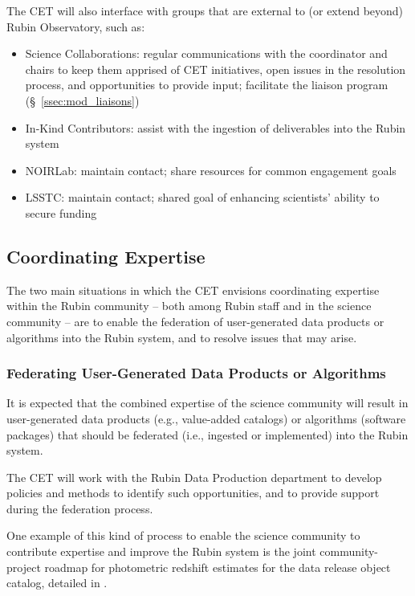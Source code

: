 \documentclass[DM,lsstdraft,toc]{lsstdoc}
\begin{document}
The CET will also interface with groups that are external to (or extend beyond) Rubin Observatory, such as:
\begin{itemize}
\item Science Collaborations: regular communications with the coordinator and chairs to keep them apprised of CET initiatives, open issues in the resolution process, and opportunities to provide input; facilitate the liaison program (\S~\ref{ssec:mod_liaisons})
\item In-Kind Contributors: assist with the ingestion of deliverables into the Rubin system
\item NOIRLab: maintain contact; share resources for common engagement goals
\item LSSTC: maintain contact; shared goal of enhancing scientists' ability to secure funding
\end{itemize}


\subsection{Coordinating Expertise}\label{ssec:mod_coord}

The two main situations in which the CET envisions coordinating expertise within the Rubin community -- both among Rubin staff and in the science community -- are to enable the federation of user-generated data products or algorithms into the Rubin system, and to resolve issues that may arise.


\subsubsection{Federating User-Generated Data Products or Algorithms}\label{sssec:mod_coord_ug}

It is expected that the combined expertise of the science community will result in user-generated data products (e.g., value-added catalogs) or algorithms (software packages) that should be federated (i.e., ingested or implemented) into the Rubin system.

The CET will work with the Rubin Data Production department to develop policies and methods to identify such opportunities, and to provide support during the federation process.

One example of this kind of process to enable the science community to contribute expertise and improve the Rubin system is the joint community-project roadmap for photometric redshift estimates for the data release object catalog, detailed in .
\end{document}
